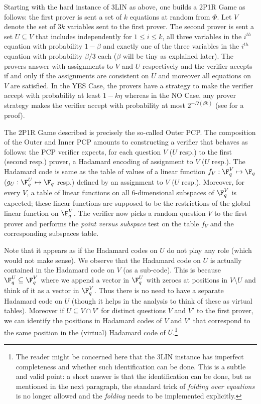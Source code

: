 Starting with the hard instance of 3LIN as above, one builds a 2P1R Game as follows:
the first prover is sent a set of $k$ equations at random from $\Phi$. Let $V$ denote
the set of $3k$ variables sent to the first prover. The second prover is sent a set
$U \subseteq V$ that includes independently for $1 \leq i \leq k$, all three variables
in the $i^{th}$ equation with probability $1-\beta$ and exactly one of the three variables
in the $i^{th}$ equation with probability ${\beta}/{3}$ each
($\beta$ will be tiny as explained later).
The provers answer with assignments to $V$ and $U$ respectively and the verifier accepts
if and only if the assignments are consistent on $U$ and moreover all equations on $V$
are satisfied. In the YES Case, the provers have a strategy to make the verifier
accept with probability at least $1-k\eta$ whereas in the NO Case, any prover
strategy makes the verifier accept with probability at most $2^{-\Omega(\beta k)}$ (see
 for a proof).

The 2P1R Game described is precisely the so-called Outer PCP\@. The composition of the
Outer and Inner PCP amounts to constructing a verifier that behaves as follows: the
PCP verifier expects, for each question $V$ ($U$ resp.) to the first (second resp.)
prover, a Hadamard encoding of assignment to $V$ ($U$ resp.). The Hadamard code is
same as the table of values of a linear function $f_V : \F_q^V \mapsto \F_q$ ($g_U: \F_q^U \mapsto \F_q$ resp.)
defined by an assignment to $V$ ($U$ resp.). Moreover, for every
$V$, a table of linear functions on all $6$-dimensional subspaces of $\F_q^V$ is
expected; these linear functions are supposed to be the restrictions of the global
linear function on $\F_q^V$. The verifier now picks a random question $V$ to the
first prover and performs the \emph{point versus subspace} test on the table
$f_V$ and the corresponding subspaces table.


Note that it appears as if the Hadamard codes on $U$ do not play any role (which would
not make sense). We observe that the Hadamard code on $U$ is actually contained in
the Hadamard code on $V$ (as a sub-code). This is because $\F_q^U \subseteq \F_q^V$ where
we append a vector in $\F_q^U$ with zeroes at positions in $V \setminus U$
and think of it as a vector in  $\F_q^V$. Thus there is no need to have a separate
Hadamard code on $U$ (though it helps in the analysis to think of these as virtual
tables). Moreover if $U \subseteq V \cap V'$ for distinct questions $V$ and $V'$ to the
first prover, we can identify the positions in Hadamard codes of $V$ and $V'$ that
correspond to the same position in the (virtual) Hadamard code of $U$.\footnote{The
reader might be concerned here that the 3LIN instance has imperfect
completeness and whether such identification can be done. This is a subtle and valid point:
a short answer is that
the identification can be done, but as mentioned in the next paragraph, the standard trick of \emph{folding over equations}
is no longer allowed and the \emph{folding} needs to be implemented explicitly.}

